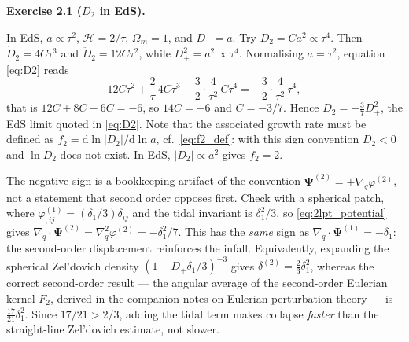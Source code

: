 \documentclass[a4paper,11pt]{article}
\newcommand{\vPsi}{\bm{\Psi}}
\def\cH{\mathcal{H}}
\newcommand{\dd}{\mathrm{d}}
\def\Om{\Omega_m}
\newenvironment{solution}[1]
  {\par\medskip\noindent\textbf{#1}\par\nobreak\smallskip}
  {\par\medskip}
\begin{document}
\begin{solution}{Exercise 2.1 ($D_2$ in EdS).}
In EdS, $a \propto \tau^2$, $\cH = 2/\tau$, $\Om = 1$, and $D_+ = a$. Try
$D_2 = C a^2 \propto \tau^4$. Then $\dot D_2 = 4C\tau^3$ and
$\ddot D_2 = 12C\tau^2$, while $D_+^2 = a^2 \propto \tau^4$. Normalising
$a = \tau^2$, equation \eqref{eq:D2} reads
\begin{equation*}
12C\tau^2 + \frac{2}{\tau}\,4C\tau^3 - \frac{3}{2}\cdot\frac{4}{\tau^2}\,C\tau^4
= -\frac{3}{2}\cdot\frac{4}{\tau^2}\,\tau^4 ,
\end{equation*}
that is $12C + 8C - 6C = -6$, so $14C = -6$ and $C = -3/7$. Hence
$D_2 = -\tfrac37 D_+^2$, the EdS limit quoted in \eqref{eq:D2}. Note that the
associated growth rate must be defined as $f_2 = \dd\ln|D_2|/\dd\ln a$, cf.\
\eqref{eq:f2_def}: with this sign convention $D_2<0$ and $\ln D_2$ does not
exist. In EdS, $|D_2| \propto a^2$ gives $f_2 = 2$.

The negative sign is a bookkeeping artifact of the convention
$\vPsi^{(2)} = +\nabla_q\varphi^{(2)}$, not a statement that second order opposes
first. Check with a spherical patch, where $\varphi^{(1)}_{,ij} = (\delta_1/3)\delta_{ij}$
and the tidal invariant is $\delta_1^2/3$, so \eqref{eq:2lpt_potential} gives
$\nabla_q\cdot\vPsi^{(2)} = \nabla^2_q\varphi^{(2)} = -\delta_1^2/7$. This has the
\emph{same} sign as $\nabla_q\cdot\vPsi^{(1)} = -\delta_1$: the second-order
displacement reinforces the infall. Equivalently, expanding the spherical
Zel'dovich density $(1-D_+\delta_1/3)^{-3}$ gives $\delta^{(2)} = \tfrac23\delta_1^2$,
whereas the correct second-order result --- the angular average of the
second-order Eulerian kernel $F_2$, derived in the companion notes on Eulerian
perturbation theory --- is $\tfrac{17}{21}\delta_1^2$. Since $17/21 > 2/3$, adding the tidal term makes
collapse \emph{faster} than the straight-line Zel'dovich estimate, not slower.
\end{solution}
\end{document}
